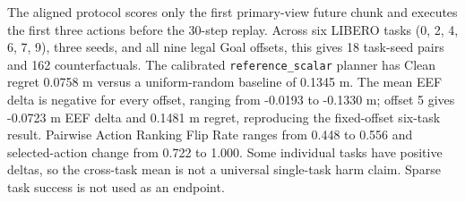 \documentclass[10pt]{article}
\begin{document}
The aligned protocol scores only the first primary-view future chunk and executes the first three actions before the 30-step replay. Across six LIBERO tasks (0, 2, 4, 6, 7, 9), three seeds, and all nine legal Goal offsets, this gives 18 task-seed pairs and 162 counterfactuals. The calibrated \texttt{reference\_scalar} planner has Clean regret 0.0758 m versus a uniform-random baseline of 0.1345 m. The mean EEF delta is negative for every offset, ranging from -0.0193 to -0.1330 m; offset 5 gives -0.0723 m EEF delta and 0.1481 m regret, reproducing the fixed-offset six-task result. Pairwise Action Ranking Flip Rate ranges from 0.448 to 0.556 and selected-action change from 0.722 to 1.000. Some individual tasks have positive deltas, so the cross-task mean is not a universal single-task harm claim. Sparse task success is not used as an endpoint.
\end{document}
